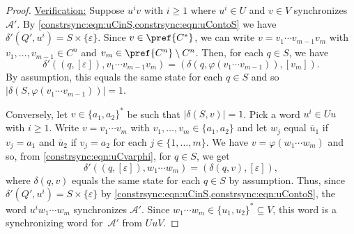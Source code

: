 \begin{proof}
	\medskip
	\noindent\underline{Verification:} Suppose $u^i v$ with $i \ge 1$ where $u^i \in U$ and $v \in V$
	synchronizes $\mathcal A'$. By \cref{constrsync:eqn:uCinS,constrsync:eqn:uContoS} 
	we have $\delta'(Q', u^i) = S \times \{\varepsilon\}$.
	Since $v \in \pref{C^*}$, we can write $v = v_1 \cdots v_{m-1} v_m$
	with $v_1, \ldots, v_{m-1} \in C^n$ and $v_m \in \pref{C^n}\setminus C^n$.
	Then, for each $q \in S$, we have
	\[
	\delta'((q, [\varepsilon]), v_1 \cdots v_{m-1}v_m ) 
	= (\delta(q, \varphi(v_1\cdots v_{m-1})), [v_m]).
	\]
	By assumption, this equals the same state for each $q \in S$
	and so $|\delta(S, \varphi(v_1\cdots v_{m-1}))| = 1$.
		
	Conversely, let $v \in \{a_1, a_2\}^*$
	be such that $|\delta(S, v)| = 1$.
	Pick a word $u^i \in Uu$ with $i \ge 1$.
	Write $v = v_1 \cdots v_m$ with $v_1, \ldots, v_m \in \{a_1, a_2\}$
	and let $w_j$ equal $\overline{u}_1$ if $v_j = a_1$
	and $\overline{u}_2$ if $v_j = a_2$ for each $j \in \{1,\ldots,m\}$.
	We have $v = \varphi(w_1 \cdots w_m)$ and so, from \cref{constrsync:eqn:uCvarphi},
	for $q \in S$, we get
	\[
	\delta'((q, [\varepsilon]), w_1 \cdots w_m) = (\delta(q, v), [\varepsilon]),
	\]
	where $\delta(q, v)$ equals the same state for each $q \in S$ by assumption.
	Thus, since $\delta'(Q', u^i) = S \times \{\varepsilon\}$
	by \cref{constrsync:eqn:uCinS,constrsync:eqn:uContoS},
	the word $u^i w_1 \cdots w_m$ synchronizes $\mathcal A'$.
	Since $w_1 \cdots w_m \in \{u_1, u_2\}^* \subseteq V$, this word
	is a synchronizing word for~$\mathcal A'$
	from $UuV$.
\end{proof}

